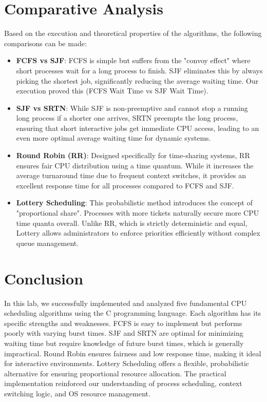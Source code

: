 \documentclass[12pt,a4paper]{article}
\begin{document}
\newpage
\section{Comparative Analysis}
Based on the execution and theoretical properties of the algorithms, the following comparisons can be made:
\begin{itemize}
    \item \textbf{FCFS vs SJF}: FCFS is simple but suffers from the "convoy effect" where short processes wait for a long process to finish. SJF eliminates this by always picking the shortest job, significantly reducing the average waiting time. Our execution proved this (FCFS Wait Time vs SJF Wait Time).
    \item \textbf{SJF vs SRTN}: While SJF is non-preemptive and cannot stop a running long process if a shorter one arrives, SRTN preempts the long process, ensuring that short interactive jobs get immediate CPU access, leading to an even more optimal average waiting time for dynamic systems.
    \item \textbf{Round Robin (RR)}: Designed specifically for time-sharing systems, RR ensures fair CPU distribution using a time quantum. While it increases the average turnaround time due to frequent context switches, it provides an excellent response time for all processes compared to FCFS and SJF.
    \item \textbf{Lottery Scheduling}: This probabilistic method introduces the concept of "proportional share". Processes with more tickets naturally secure more CPU time quanta overall. Unlike RR, which is strictly deterministic and equal, Lottery allows administrators to enforce priorities efficiently without complex queue management.
\end{itemize}

\section{Conclusion}
In this lab, we successfully implemented and analyzed five fundamental CPU scheduling algorithms using the C programming language. Each algorithm has its specific strengths and weaknesses. FCFS is easy to implement but performs poorly with varying burst times. SJF and SRTN are optimal for minimizing waiting time but require knowledge of future burst times, which is generally impractical. Round Robin ensures fairness and low response time, making it ideal for interactive environments. Lottery Scheduling offers a flexible, probabilistic alternative for ensuring proportional resource allocation. The practical implementation reinforced our understanding of process scheduling, context switching logic, and OS resource management.
\end{document}

